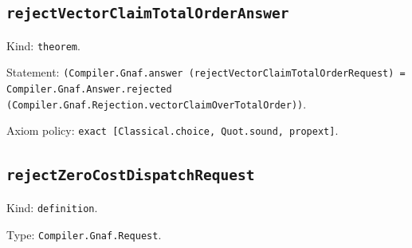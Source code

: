 \documentclass[11pt]{article}
\begin{document}
\subsection*{\texttt{rejectVectorClaimTotalOrderAnswer}}
\noindent Kind: \texttt{theorem}.\par
\noindent Statement: \texttt{(Compiler.Gnaf.answer (rejectVectorClaimTotalOrderRequest) = Compiler.Gnaf.Answer.rejected (Compiler.Gnaf.Rejection.vectorClaimOverTotalOrder))}.\par
\noindent Axiom policy: \texttt{exact [Classical.choice, Quot.sound, propext]}.\par
\subsection*{\texttt{rejectZeroCostDispatchRequest}}
\noindent Kind: \texttt{definition}.\par
\noindent Type: \texttt{Compiler.Gnaf.Request}.\par
\end{document}
